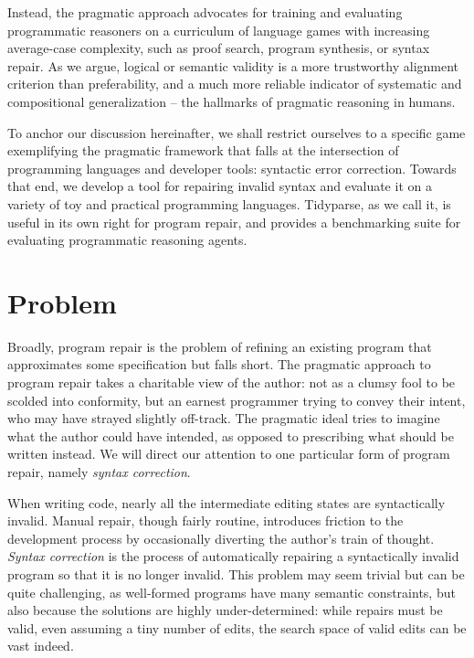\documentclass[sigplan,screen]{acmart}
\begin{document}
Instead, the pragmatic approach advocates for training and evaluating programmatic reasoners on a curriculum of language games with increasing average-case complexity, such as proof search, program synthesis, or syntax repair. As we argue, logical or semantic validity is a more trustworthy alignment criterion than preferability, and a much more reliable indicator of systematic and compositional generalization -- the hallmarks of pragmatic reasoning in humans.

To anchor our discussion hereinafter, we shall restrict ourselves to a specific game exemplifying the pragmatic framework that falls at the intersection of programming languages and developer tools: syntactic error correction. Towards that end, we develop a tool for repairing invalid syntax and evaluate it on a variety of toy and practical programming languages. Tidyparse, as we call it, is useful in its own right for program repair, and provides a benchmarking suite for evaluating programmatic reasoning agents.

\section{Problem}


Broadly, program repair is the problem of refining an existing program that approximates some specification but falls short. The pragmatic approach to program repair takes a charitable view of the author: not as a clumsy fool to be scolded into conformity, but an earnest programmer trying to convey their intent, who may have strayed slightly off-track. The pragmatic ideal tries to imagine what the author could have intended, as opposed to prescribing what should be written instead. We will direct our attention to one particular form of program repair, namely \emph{syntax correction}.

When writing code, nearly all the intermediate editing states are syntactically invalid. Manual repair, though fairly routine, introduces friction to the development process by occasionally diverting the author's train of thought. \textit{Syntax correction} is the process of automatically repairing a syntactically invalid program so that it is no longer invalid. This problem may seem trivial but can be quite challenging, as well-formed programs have many semantic constraints, but also because the solutions are highly under-determined: while repairs must be valid, even assuming a tiny number of edits, the search space of valid edits can be vast indeed.
\end{document}
